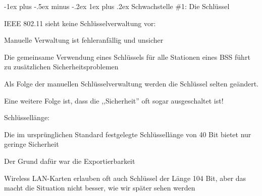 \documentclass[a4paper]{article}
\makeatletter
\renewcommand{\subsubsection}{\@startsection{subsubsection}{3}{0mm}%
 {-1ex plus -.5ex minus -.2ex}%
 {1ex plus .2ex}%
 {\normalfont\small\bfseries}}
\makeatother
\begin{document}
\begin{multicols}{3}
      \subsubsection{Schwachstelle \#1: Die Schlüssel}
      \begin{itemize*}
            \item IEEE 802.11 sieht keine Schlüsselverwaltung vor:
            \begin{itemize*}
                  \item Manuelle Verwaltung ist fehleranfällig und unsicher
                  \item Die gemeinsame Verwendung eines Schlüssels für alle Stationen eines BSS führt zu zusätzlichen Sicherheitsproblemen
                  \item Als Folge der manuellen Schlüsselverwaltung werden die Schlüssel selten geändert.
                  \item Eine weitere Folge ist, dass die ,,Sicherheit'' oft sogar ausgeschaltet ist!
            \end{itemize*}
            \item Schlüssellänge:
            \begin{itemize*}
                  \item Die im ursprünglichen Standard festgelegte Schlüssellänge von 40 Bit bietet nur geringe Sicherheit
                  \item Der Grund dafür war die Exportierbarkeit
                  \item Wireless LAN-Karten erlauben oft auch Schlüssel der Länge 104 Bit, aber das macht die Situation nicht besser, wie wir später sehen werden
            \end{itemize*}
      \end{itemize*}


\end{multicols}
\end{document}
